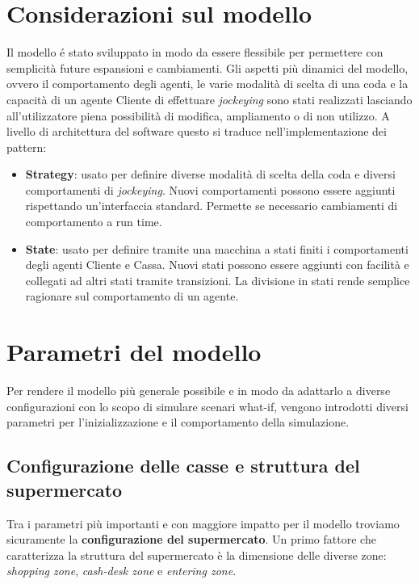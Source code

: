 \section{Considerazioni sul modello}

Il modello é stato sviluppato in modo da essere flessibile per
permettere con semplicità future espansioni e cambiamenti. Gli aspetti
più dinamici del modello, ovvero il comportamento degli agenti, le
varie modalità di scelta di una coda e la capacità di un agente
Cliente di effettuare \textit{jockeying} sono stati realizzati lasciando
all'utilizzatore piena possibilità di modifica, ampliamento o di non
utilizzo. A livello di architettura del software questo si traduce
nell'implementazione dei pattern:

\begin{itemize}
\item \textbf{Strategy}: usato per definire diverse modalità di scelta
  della coda e diversi comportamenti di \textit{jockeying}. Nuovi comportamenti possono essere aggiunti rispettando un'interfaccia standard. Permette se necessario cambiamenti di comportamento a run time.
\item \textbf{State}: usato per definire tramite una macchina a stati
  finiti i comportamenti degli agenti Cliente e Cassa. Nuovi stati
  possono essere aggiunti con facilità e collegati ad altri stati
  tramite transizioni. La divisione in stati rende semplice ragionare
  sul comportamento di un agente.
\end{itemize}

\section{Parametri del modello}
\label{model:parameters}

Per rendere il modello più generale possibile e in modo da adattarlo a diverse configurazioni con lo scopo di simulare scenari what-if, vengono introdotti diversi parametri per l'inizializzazione e il comportamento della simulazione.

\subsection{Configurazione delle casse e struttura del supermercato}
Tra i parametri più importanti e con maggiore impatto per il modello troviamo sicuramente la \textbf{configurazione del supermercato}. Un primo fattore che caratterizza la struttura del supermercato  è la dimensione delle diverse zone: \textit{shopping zone}, \textit{cash-desk zone} e \textit{entering zone}.

